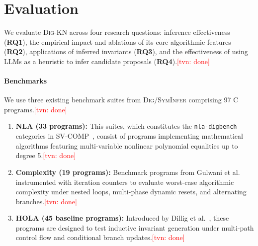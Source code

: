 \documentclass[runningheads]{llncs}
\newcommand{\tool}{\textsc{Dig-KN}\xspace}
\newcommand{\digold}{\textsc{Dig/SymInfer}\xspace}
\newcommand{\tvn}[1]{\textcolor{red}{[tvn: #1]}}
\newcommand{\code}[1]{\texttt{\small #1}}
\begin{document}
\section{Evaluation}
\label{sec:eval}

We evaluate \tool{} across four research questions:
inference effectiveness (\textbf{RQ1}),
the empirical impact and ablations of its core algorithmic features (\textbf{RQ2}),
applications of inferred invariants (\textbf{RQ3}),
and the effectiveness of using LLMs as a heuristic to infer candidate proposals (\textbf{RQ4}).\tvn{done}

\paragraph{Benchmarks}  We use three existing benchmark suites from \digold{}\cite{nguyen2021using} comprising 97 C programs.\tvn{done}

\begin{enumerate}[leftmargin=1.5em,itemsep=1pt]
  \item \textbf{NLA (33 programs):} This suites, which constitutes the \code{nla-digbench} categories in SV-COMP~\cite{svcomp,beyer2024svcomp},
        consist of programs implementing mathematical algorithms featuring multi-variable nonlinear polynomial equalities up to degree 5.\tvn{done}  

  \item \textbf{Complexity (19 programs):}
        Benchmark programs from Gulwani et al.~\cite{gulwani2009speed} instrumented with iteration counters to evaluate worst-case algorithmic complexity under nested loops, multi-phase dynamic resets, and alternating branches.\tvn{done}

  \item \textbf{HOLA (45 baseline programs):} Introduced by Dillig et al.~\cite{dillig2013hola}, these programs are designed to test inductive invariant generation under multi-path control flow and conditional branch updates.\tvn{done}
        
\end{enumerate}
\end{document}

